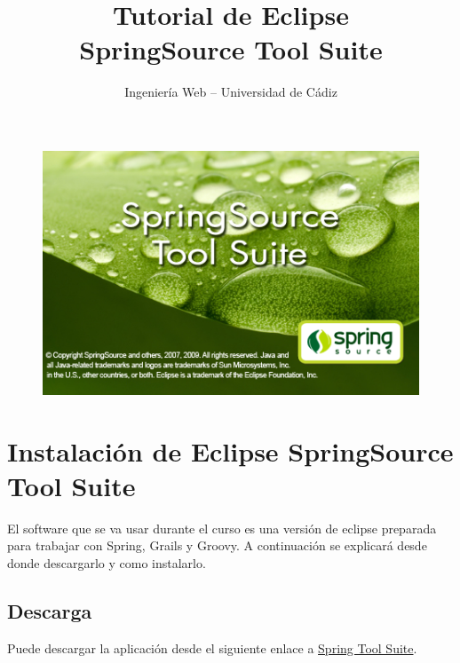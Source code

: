 \documentclass[a4paper,12pt,spanish]{article}
\author{Ingeniería Web -- Universidad de Cádiz}
\title{Tutorial de Eclipse \\SpringSource Tool Suite}
\begin{document}
\begin{titlepage}
  \maketitle
  \begin{figure}[h!]
    \centering
    \includegraphics[scale=0.55]{sts}
    \label{fig:Portada}
  \end{figure}
\tableofcontents
\end{titlepage}
 

\newpage 

\section{Instalación de Eclipse SpringSource Tool Suite}

El software que se va usar durante el curso es una versión de eclipse preparada para trabajar con Spring, Grails y Groovy. A continuación se explicará desde donde descargarlo y como instalarlo.


\subsection{Descarga}

Puede descargar la aplicación desde el siguiente enlace a \href{http://www.springsource.com/products/springsource-google-download?utm\_source=eclipse.org\&utm\_medium=web\&utm\_content=promotedDL\&utm\_campaign=STS}{Spring Tool Suite}.
\end{document}
